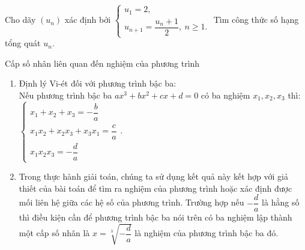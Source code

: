 \begin{bt}%
	Cho dãy $\left(u_n\right)$ xác định bởi $\begin{cases}
	u_1=2,\\ 
	u_{n+1}=\dfrac{u_n +1}{2},\ n\geq 1.
	\end{cases}$ Tìm công thức số hạng tổng quát $u_n$.
\end{bt}
\newpage
\begin{dang}{Cấp số nhân liên quan đến nghiệm của phương trình}
	\begin{enumerate}
		\item Định lý Vi-ét đối với phương trình bậc ba:\\ 
		Nếu phương trình bậc ba $ax^3+bx^2+cx+d=0$ có ba nghiệm $x_1, x_2, x_3$ thì: 
		$ \begin{cases}x_1+x_2+x_3=-\dfrac{b}{a}\\
		x_1x_2+x_2x_3+x_3x_1=\dfrac{c}{a}\\
		x_1x_2x_3=-\dfrac{d}{a}\end{cases}$.
		\item Trong thực hành giải toán, chúng ta sử dụng kết quả này kết hợp với giả thiết của bài toán để tìm ra nghiệm của phương trình hoặc xác định được mối liên hệ giữa các hệ số của phương trình. 
		Trường hợp nếu $-\dfrac{d}{a}$ là hằng số thì điều kiện cần để phương trình bậc ba nói trên có ba nghiệm lập thành một cấp số nhân là $x=\sqrt[3]{-\dfrac{d}{a}}$ là nghiệm của phương trình bậc ba đó. 
	\end{enumerate}
\end{dang}

